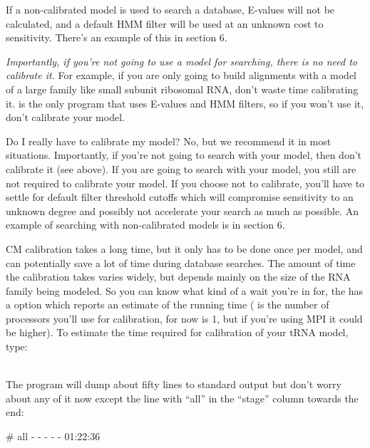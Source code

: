 If a non-calibrated model is used to search a database, E-values will not
be calculated, and a default HMM filter will be used at an unknown
cost to sensitivity. There's an example of this in section 6. 

\emph{Importantly, if you're not going to use a model for searching,
there is no need to calibrate it.} For example, if you are only going
to build alignments with a model of a large family like small subunit
ribosomal RNA, don't waste time calibrating it.  is the
only  program that uses E-values and HMM filters,
so if you won't use it, don't calibrate your model.

\begin{srefaq}{Do I really have to calibrate my model?} No, but we
  recommend it in most situations. Importantly, if you're not going to
  search with your model, then don't calibrate it (see above). If you
  are going to search with your model, you still are not required to
  calibrate your model. If you choose not to calibrate, you'll have to
  settle for default filter threshold cutoffs which will compromise
  sensitivity to an unknown degree and possibly not accelerate your
  search as much as possible. An example of
  searching with non-calibrated models is in section 6.
\end{srefaq}

CM calibration takes a long time, but it only has
to be done once per model, and can potentially save a lot of time
during database searches. The amount of time the calibration takes
varies widely, but depends mainly on the size of the RNA family being
modeled. 
So you can know what kind of a wait you're in for, the
 has a  option which reports an
estimate of the running time ( is the number of processors
you'll use for calibration, for now 
is 1, but if you're using MPI it could be higher). To estimate the
time required for calibration of your tRNA
model, type:

\\

The program will dump about fifty lines to standard output but 
don't worry about any of it now except the line with ``all'' in the
``stage'' column towards the end:

\begin{sreoutput}
# all         -    -    -          -      -       01:22:36
\end{sreoutput}

